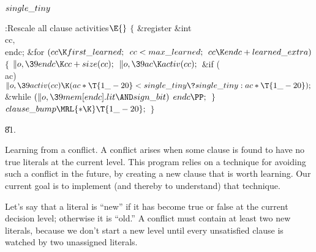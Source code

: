 \B\D$\\{single\_tiny}$ \5
\par
\Y\B\4:Rescale all clause activities\X${}\E{}$\6
${}\{{}$\1\6
\&{register} \&{int} \\{cc}${},{}$ \\{endc};\7
\&{for} ${}(\\{cc}\K\\{first\_learned};{}$ ${}\\{cc}<\\{max\_learned};{}$ ${}%
\\{cc}\K\\{endc}+\\{learned\_extra}){}$\5
${}\{{}$\1\6
${}\|o,\39\\{endc}\K\\{cc}+\\{size}(\\{cc});{}$\6
${}\|o,\39\\{ac}\K\\{activ}(\\{cc});{}$\6
\&{if} (\\{ac})\1\5
${}\|o,\39\\{activ}(\\{cc})\K(\\{ac}*\T{1\_-20}<\\{single\_tiny}\?\\{single%
\_tiny}:\\{ac}*\T{1\_-20});{}$\2\6
\&{while} ${}(\|o,\39\\{mem}[\\{endc}].\\{lit}\AND\\{sign\_bit}){}$\1\5
${}\\{endc}\PP;{}$\2\6
\4${}\}{}$\2\6
${}\\{clause\_bump}\MRL{*{\K}}\T{1\_-20};{}$\6
\4${}\}{}$\2\par
\U81.\fi

Learning from a conflict.
A conflict arises when some clause is found to have no true literals
at the current level. This program relies on a technique for avoiding
such a conflict in the future,
by creating a new clause that is worth learning. Our current
goal is to implement (and thereby to understand) that technique.

Let's say that a literal is ``new'' if it has become true or false at
the current decision level; otherwise it is ``old.'' A conflict must
contain at least two new literals, because we don't start a new level
until every unsatisfied clause is watched by two unassigned literals.

